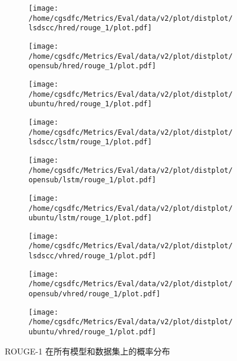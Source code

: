 \begin{figure}%
\centering%
\begin{subfigure}{0.3333333333333333\linewidth}%
\centering%
\texttt{[image: /home/cgsdfc/Metrics/Eval/data/v2/plot/distplot/lsdscc/hred/rouge\_1/plot.pdf]}%
\end{subfigure}%
\begin{subfigure}{0.3333333333333333\linewidth}%
\centering%
\texttt{[image: /home/cgsdfc/Metrics/Eval/data/v2/plot/distplot/opensub/hred/rouge\_1/plot.pdf]}%
\end{subfigure}%
\begin{subfigure}{0.3333333333333333\linewidth}%
\centering%
\texttt{[image: /home/cgsdfc/Metrics/Eval/data/v2/plot/distplot/ubuntu/hred/rouge\_1/plot.pdf]}%
\end{subfigure}%
\newline%
\begin{subfigure}{0.3333333333333333\linewidth}%
\centering%
\texttt{[image: /home/cgsdfc/Metrics/Eval/data/v2/plot/distplot/lsdscc/lstm/rouge\_1/plot.pdf]}%
\end{subfigure}%
\begin{subfigure}{0.3333333333333333\linewidth}%
\centering%
\texttt{[image: /home/cgsdfc/Metrics/Eval/data/v2/plot/distplot/opensub/lstm/rouge\_1/plot.pdf]}%
\end{subfigure}%
\begin{subfigure}{0.3333333333333333\linewidth}%
\centering%
\texttt{[image: /home/cgsdfc/Metrics/Eval/data/v2/plot/distplot/ubuntu/lstm/rouge\_1/plot.pdf]}%
\end{subfigure}%
\newline%
\begin{subfigure}{0.3333333333333333\linewidth}%
\centering%
\texttt{[image: /home/cgsdfc/Metrics/Eval/data/v2/plot/distplot/lsdscc/vhred/rouge\_1/plot.pdf]}%
\end{subfigure}%
\begin{subfigure}{0.3333333333333333\linewidth}%
\centering%
\texttt{[image: /home/cgsdfc/Metrics/Eval/data/v2/plot/distplot/opensub/vhred/rouge\_1/plot.pdf]}%
\end{subfigure}%
\begin{subfigure}{0.3333333333333333\linewidth}%
\centering%
\texttt{[image: /home/cgsdfc/Metrics/Eval/data/v2/plot/distplot/ubuntu/vhred/rouge\_1/plot.pdf]}%
\end{subfigure}%
\caption{ROUGE{-}1 在所有模型和数据集上的概率分布}%
\label{fig:ROUGE{-}1{-}dist{-}all}%
\end{figure}